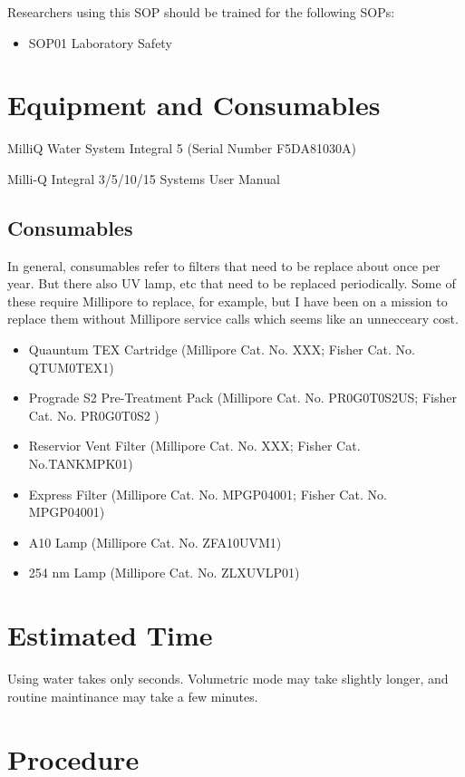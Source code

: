 \documentclass[12pt]{../SOP3_beta}\usepackage[]{graphicx}\usepackage[]{xcolor}
\begin{document}
\NP Researchers using this SOP should be trained for the following SOPs:

\begin{itemize}
  \item SOP01 Laboratory Safety
\end{itemize}

\section{Equipment and Consumables}

\NP MilliQ Water System Integral 5 (Serial Number F5DA81030A)

\NP Milli-Q Integral 3/5/10/15 Systems User Manual

\subsection{Consumables}

In general, consumables refer to filters that need to be replace about once per year. But there also UV lamp, etc that need to be replaced periodically. Some of these require Millipore to replace, for example, but I have been on a mission to replace them without Millipore service calls which seems like an unnecceary cost.

\begin{itemize}
  \item Quauntum TEX Cartridge (Millipore Cat. No. XXX; Fisher Cat. No. QTUM0TEX1)
  \item Prograde S2 Pre-Treatment Pack (Millipore Cat. No. PR0G0T0S2US; Fisher Cat. No. PR0G0T0S2 ) 
  \item Reservior Vent Filter (Millipore Cat. No. XXX; Fisher Cat. No.TANKMPK01)
  \item Express Filter (Millipore Cat. No. MPGP04001; Fisher Cat. No. MPGP04001)
  \item A10 Lamp (Millipore Cat. No. ZFA10UVM1)
  \item 254 nm Lamp (Millipore Cat. No. ZLXUVLP01)
\end{itemize}


\section{Estimated Time}

\NP Using water takes only seconds. Volumetric mode may take slightly longer, and routine maintinance may take a few minutes. 

\section{Procedure}
\end{document}
